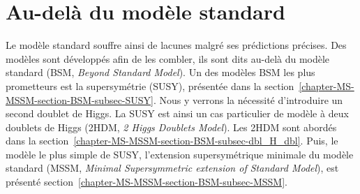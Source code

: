 \section{Au-delà du modèle standard}\label{chapter-MS-MSSM-section-BSM}
Le modèle standard souffre ainsi de lacunes malgré ses prédictions précises.
Des modèles sont développés afin de les combler, ils sont dits \og au-delà \fg{} du modèle standard (BSM, \emph{Beyond Standard Model}).
Un des modèles BSM les plus prometteurs est la supersymétrie (SUSY), présentée dans la section~\ref{chapter-MS-MSSM-section-BSM-subsec-SUSY}.
Nous y verrons la nécessité d'introduire un second doublet de Higgs.
La SUSY est ainsi un cas particulier de modèle à deux doublets de Higgs (2HDM, \emph{2 Higgs Doublets Model}).
Les 2HDM sont abordés dans la section~\ref{chapter-MS-MSSM-section-BSM-subsec-dbl_H_dbl}.
Puis, le modèle le plus simple de SUSY, l'extension supersymétrique minimale du modèle standard (MSSM, \emph{Minimal Supersymmetric extension of Standard Model}), est présenté section~\ref{chapter-MS-MSSM-section-BSM-subsec-MSSM}.
